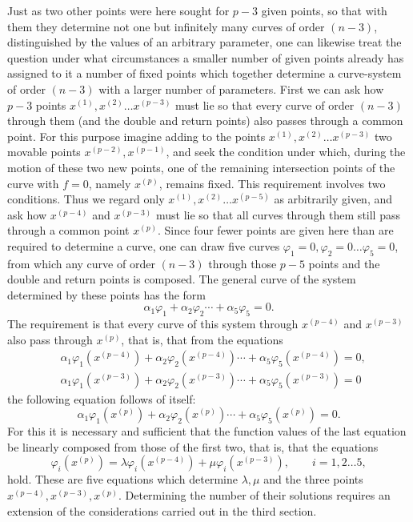 \documentclass[10pt]{article}
\begin{document}
Just as two other points were here sought for \(p-3\) given points, so that with them they determine not one but infinitely many curves of order \((n-3)\), distinguished by the values of an arbitrary parameter, one can likewise treat the question under what circumstances a smaller number of given points already has assigned to it a number of fixed points which together determine a curve-system of order \((n-3)\) with a larger number of parameters. First we can ask how \(p-3\) points \(x^{(1)},x^{(2)}\ldots x^{(p-3)}\) must lie so that every curve of order \((n-3)\) through them (and the double and return points) also passes through a common point. For this purpose imagine adding to the points \(x^{(1)},x^{(2)}\ldots x^{(p-3)}\) two movable points \(x^{(p-2)},x^{(p-1)}\), and seek the condition under which, during the motion of these two new points, one of the remaining intersection points of the curve with \(f=0\), namely \(x^{(p)}\), remains fixed. This requirement involves two conditions. Thus we regard only \(x^{(1)},x^{(2)}\ldots x^{(p-5)}\) as arbitrarily given, and ask how \(x^{(p-4)}\) and \(x^{(p-3)}\) must lie so that all curves through them still pass through a common point \(x^{(p)}\). Since four fewer points are given here than are required to determine a curve, one can draw five curves \(\varphi_1=0,\varphi_2=0\ldots\varphi_5=0\), from which any curve of order \((n-3)\) through those \(p-5\) points and the double and return points is composed. The general curve of the system determined by these points has the form
\[
\alpha_1\varphi_1+\alpha_2\varphi_2\cdots+\alpha_5\varphi_5=0.
\]
The requirement is that every curve of this system through \(x^{(p-4)}\) and \(x^{(p-3)}\) also pass through \(x^{(p)}\), that is, that from the equations
\[
\begin{aligned}
&\alpha_1\varphi_1(x^{(p-4)})+\alpha_2\varphi_2(x^{(p-4)})\cdots+\alpha_5\varphi_5(x^{(p-4)})=0,\\
&\alpha_1\varphi_1(x^{(p-3)})+\alpha_2\varphi_2(x^{(p-3)})\cdots+\alpha_5\varphi_5(x^{(p-3)})=0
\end{aligned}
\]
the following equation follows of itself:
\[
\alpha_1\varphi_1(x^{(p)})+\alpha_2\varphi_2(x^{(p)})\cdots+\alpha_5\varphi_5(x^{(p)})=0.
\]
For this it is necessary and sufficient that the function values of the last equation be linearly composed from those of the first two, that is, that the equations
\[
\varphi_i(x^{(p)})=\lambda\varphi_i(x^{(p-4)})+\mu\varphi_i(x^{(p-3)}),
\qquad i=1,2\ldots 5,
\]
hold. These are five equations which determine \(\lambda,\mu\) and the three points \(x^{(p-4)},x^{(p-3)},x^{(p)}\). Determining the number of their solutions requires an extension of the considerations carried out in the third section.
\end{document}
